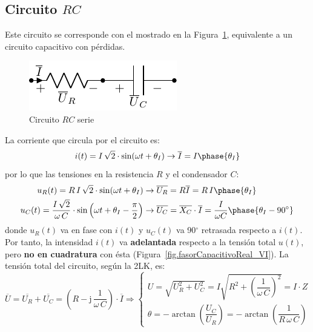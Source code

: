 \documentclass[11pt]{book} %
\begin{document}
	\subsection{Circuito $RC$}\label{sec.RC}
	
	Este circuito se corresponde con el mostrado en la Figura~\ref{fig.RC}, equivalente a un circuito capacitivo con pérdidas. 
	\begin{figure}[h]
		\centering
		\includegraphics{../figs/RC.pdf}
		\caption{Circuito $RC$ serie}
		\label{fig.RC}
	\end{figure}
	
	La corriente que circula por el circuito es:
	\begin{equation*}
		i(t)=I\,\sqrt{2}\cdot\sin(\omega t+\theta_I)\rightarrow\overline{I}=I\phase{\theta_I}
	\end{equation*}
	por lo que las tensiones en la resistencia $R$ y el condensador $C$:
	\begin{align*}
		u_R(t)=R\, I\,\sqrt{2}\cdot\sin(\omega t+\theta_I)&\rightarrow \overline{U_R} = R \overline{I}=R\,I\phase{\theta_I}\\ 
		u_C(t)=\dfrac{I\,\sqrt{2}}{\omega\,C} \cdot \sin \left(\omega t+\theta_I-\frac{\pi}{2}\right)&\rightarrow \overline{U_C}=\overline{X_C}\cdot\overline{I}=\dfrac{I}{\omega C}\phase{\theta_I-90^\circ}
	\end{align*}
	donde $u_R(t)$ va en fase con $i(t)$ y $u_C(t)$ va 90$^\circ$ retrasada respecto a $i(t)$. Por tanto, la intensidad $i(t)$ va \textbf{adelantada} respecto a la tensión total $u(t)$, pero \textbf{no en cuadratura} con ésta  (Figura~\ref{fig.fasorCapacitivoReal_VI}). La tensión total del circuito, según la 2LK, es:  
	\begin{equation*}
		\overline{U} = \overline{U_R} + \overline{U_C} =\left(R - \mathrm{j}\,\dfrac{1}{\omega\,C}\right) \cdot \overline{I}\Rightarrow 
		\begin{cases}
			U=\sqrt{U_R^2+U_C^2}=I\sqrt{R^2+\left(\dfrac{1}{\omega\,C}\right)^2}=I\cdot Z\\
			\theta=-\arctan\left( \dfrac{U_C}{U_R}\right)=-\arctan\left( \dfrac{1}{R\,\omega\,C}\right)
		\end{cases}
	\end{equation*}
	
\end{document}
